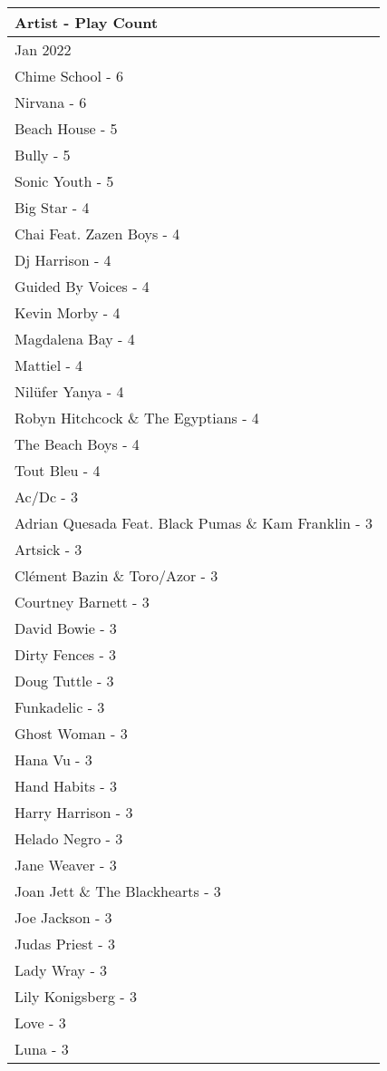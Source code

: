 \documentclass[
]{article}
\begin{document}
\captionsetup[table]{labelformat=empty,skip=1pt}
\begin{longtable}{l}
\toprule
\textbf{Artist - Play Count} \\ 
\midrule
\multicolumn{1}{l}{Jan 2022} \\ 
\midrule
Chime School - 6 \\ 
Nirvana - 6 \\ 
Beach House - 5 \\ 
Bully - 5 \\ 
Sonic Youth - 5 \\ 
Big Star - 4 \\ 
Chai Feat. Zazen Boys - 4 \\ 
Dj Harrison - 4 \\ 
Guided By Voices - 4 \\ 
Kevin Morby - 4 \\ 
Magdalena Bay - 4 \\ 
Mattiel - 4 \\ 
Nilüfer Yanya - 4 \\ 
Robyn Hitchcock \& The Egyptians - 4 \\ 
The Beach Boys - 4 \\ 
Tout Bleu - 4 \\ 
Ac/Dc - 3 \\ 
Adrian Quesada Feat. Black Pumas \& Kam Franklin - 3 \\ 
Artsick - 3 \\ 
Clément Bazin \& Toro/Azor - 3 \\ 
Courtney Barnett - 3 \\ 
David Bowie - 3 \\ 
Dirty Fences - 3 \\ 
Doug Tuttle - 3 \\ 
Funkadelic - 3 \\ 
Ghost Woman - 3 \\ 
Hana Vu - 3 \\ 
Hand Habits - 3 \\ 
Harry Harrison - 3 \\ 
Helado Negro - 3 \\ 
Jane Weaver - 3 \\ 
Joan Jett \& The Blackhearts - 3 \\ 
Joe Jackson - 3 \\ 
Judas Priest - 3 \\ 
Lady Wray - 3 \\ 
Lily Konigsberg - 3 \\ 
Love - 3 \\ 
Luna - 3 \\ 

\end{longtable}
\end{document}
